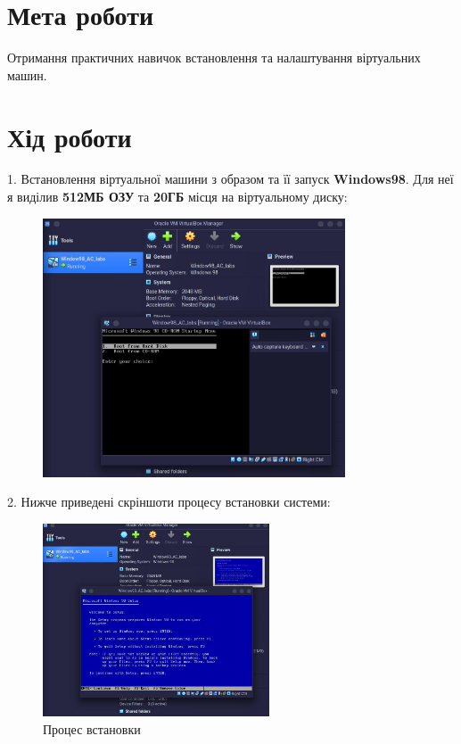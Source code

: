 \section{Мета роботи}
Отримання практичних навичок встановлення та
налаштування віртуальних машин.

\section{Хід роботи}
1. Встановлення віртуальної машини з образом та її запуск \textbf{Windows98}. Для неї я виділив \textbf{512МБ ОЗУ} та \textbf{20ГБ} місця на віртуальному диску:
\begin{figure}[h]
    \centering
    \includegraphics[width=0.8\textwidth]{reports/AC/lab1/assets/1.jpeg}
\end{figure}

\newpage

2. Нижче приведені скріншоти процесу встановки системи:
\begin{figure}[h]
    \centering
    \includegraphics[width=0.6\textwidth]{reports/AC/lab1/assets/2.jpeg}
    \caption{Процес встановки}
\end{figure}

